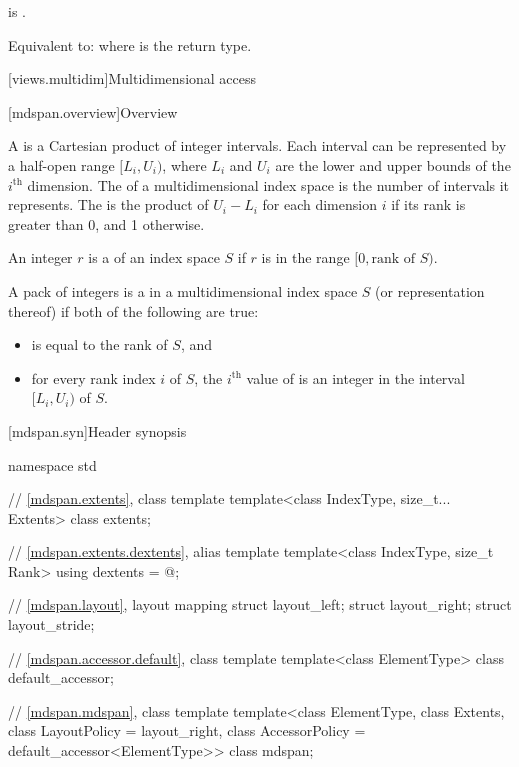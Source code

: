 \begin{itemdescr}
\pnum
\constraints
{} is .

\pnum
\effects
Equivalent to: 
where  is the return type.
\end{itemdescr}

[views.multidim]{Multidimensional access}

[mdspan.overview]{Overview}

\pnum
A  is
a Cartesian product of integer intervals.
Each interval can be represented by a half-open range $[L_i, U_i)$,
where $L_i$ and $U_i$ are the lower and upper bounds of
the $i^\text{th}$ dimension.
The  of a multidimensional index space is
the number of intervals it represents.
The  is
the product of $U_i - L_i$ for each dimension $i$
if its rank is greater than 0, and 1 otherwise.

\pnum
An integer $r$ is a  of an index space $S$
if $r$ is in the range $[0, \text{rank of $S$})$.

\pnum
A pack of integers  is
a  in a multidimensional index space $S$
(or representation thereof) if both of the following are true:
\begin{itemize}
\item
{} is equal to the rank of $S$, and
\item
for every rank index $i$ of $S$,
the $i^\text{th}$ value of  is an integer
in the interval $[L_i, U_i)$ of $S$.
\end{itemize}

[mdspan.syn]{Header  synopsis}

%
\begin{codeblock}
namespace std {
  // \ref{mdspan.extents}, class template 
  template<class IndexType, size_t... Extents>
    class extents;

  // \ref{mdspan.extents.dextents}, alias template 
  template<class IndexType, size_t Rank>
    using dextents = @\seebelow@;

  // \ref{mdspan.layout}, layout mapping
  struct layout_left;
  struct layout_right;
  struct layout_stride;

  // \ref{mdspan.accessor.default}, class template 
  template<class ElementType>
    class default_accessor;

  // \ref{mdspan.mdspan}, class template 
  template<class ElementType, class Extents, class LayoutPolicy = layout_right,
           class AccessorPolicy = default_accessor<ElementType>>
    class mdspan;
}
\end{codeblock}

